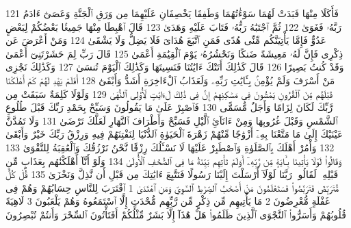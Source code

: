 {\tiny\colorbox{cl_aya}{121}} فَأَكَلَا مِنْهَا فَبَدَتْ لَهُمَا سَوْءَٰتُهُمَا وَطَفِقَا يَخْصِفَانِ عَلَيْهِمَا مِن وَرَقِ ٱلْجَنَّةِ وَعَصَىٰٓ ءَادَمُ رَبَّهُۥ فَغَوَىٰ
{\tiny\colorbox{cl_aya}{122}} ثُمَّ ٱجْتَبَٰهُ رَبُّهُۥ فَتَابَ عَلَيْهِ وَهَدَىٰ
{\tiny\colorbox{cl_aya}{123}} قَالَ ٱهْبِطَا مِنْهَا جَمِيعًۢا بَعْضُكُمْ لِبَعْضٍ عَدُوٌّ فَإِمَّا يَأْتِيَنَّكُم مِّنِّى هُدًى فَمَنِ ٱتَّبَعَ هُدَاىَ فَلَا يَضِلُّ وَلَا يَشْقَىٰ
{\tiny\colorbox{cl_aya}{124}} وَمَنْ أَعْرَضَ عَن ذِكْرِى فَإِنَّ لَهُۥ مَعِيشَةً ضَنكًا وَنَحْشُرُهُۥ يَوْمَ ٱلْقِيَٰمَةِ أَعْمَىٰ
{\tiny\colorbox{cl_aya}{125}} قَالَ رَبِّ لِمَ حَشَرْتَنِىٓ أَعْمَىٰ وَقَدْ كُنتُ بَصِيرًا
{\tiny\colorbox{cl_aya}{126}} قَالَ كَذَٰلِكَ أَتَتْكَ ءَايَٰتُنَا فَنَسِيتَهَا وَكَذَٰلِكَ ٱلْيَوْمَ تُنسَىٰ
{\tiny\colorbox{cl_aya}{127}} وَكَذَٰلِكَ نَجْزِى مَنْ أَسْرَفَ وَلَمْ يُؤْمِنۢ بِـَٔايَٰتِ رَبِّهِۦ وَلَعَذَابُ ٱلْءَاخِرَةِ أَشَدُّ وَأَبْقَىٰٓ
{\tiny\colorbox{cl_aya}{128}} أَفَلَمْ يَهْدِ لَهُمْ كَمْ أَهْلَكْنَا قَبْلَهُم مِّنَ ٱلْقُرُونِ يَمْشُونَ فِى مَسَٰكِنِهِمْ إِنَّ فِى ذَٰلِكَ لَءَايَٰتٍ لِّأُو۟لِى ٱلنُّهَىٰ
{\tiny\colorbox{cl_aya}{129}} وَلَوْلَا كَلِمَةٌ سَبَقَتْ مِن رَّبِّكَ لَكَانَ لِزَامًا وَأَجَلٌ مُّسَمًّى
{\tiny\colorbox{cl_aya}{130}} فَٱصْبِرْ عَلَىٰ مَا يَقُولُونَ وَسَبِّحْ بِحَمْدِ رَبِّكَ قَبْلَ طُلُوعِ ٱلشَّمْسِ وَقَبْلَ غُرُوبِهَا وَمِنْ ءَانَآئِ ٱلَّيْلِ فَسَبِّحْ وَأَطْرَافَ ٱلنَّهَارِ لَعَلَّكَ تَرْضَىٰ
{\tiny\colorbox{cl_aya}{131}} وَلَا تَمُدَّنَّ عَيْنَيْكَ إِلَىٰ مَا مَتَّعْنَا بِهِۦٓ أَزْوَٰجًا مِّنْهُمْ زَهْرَةَ ٱلْحَيَوٰةِ ٱلدُّنْيَا لِنَفْتِنَهُمْ فِيهِ وَرِزْقُ رَبِّكَ خَيْرٌ وَأَبْقَىٰ
{\tiny\colorbox{cl_aya}{132}} وَأْمُرْ أَهْلَكَ بِٱلصَّلَوٰةِ وَٱصْطَبِرْ عَلَيْهَا لَا نَسْـَٔلُكَ رِزْقًا نَّحْنُ نَرْزُقُكَ وَٱلْعَٰقِبَةُ لِلتَّقْوَىٰ
{\tiny\colorbox{cl_aya}{133}} وَقَالُوا۟ لَوْلَا يَأْتِينَا بِـَٔايَةٍ مِّن رَّبِّهِۦٓ أَوَلَمْ تَأْتِهِم بَيِّنَةُ مَا فِى ٱلصُّحُفِ ٱلْأُولَىٰ
{\tiny\colorbox{cl_aya}{134}} وَلَوْ أَنَّآ أَهْلَكْنَٰهُم بِعَذَابٍ مِّن قَبْلِهِۦ لَقَالُوا۟ رَبَّنَا لَوْلَآ أَرْسَلْتَ إِلَيْنَا رَسُولًا فَنَتَّبِعَ ءَايَٰتِكَ مِن قَبْلِ أَن نَّذِلَّ وَنَخْزَىٰ
{\tiny\colorbox{cl_aya}{135}} قُلْ كُلٌّ مُّتَرَبِّصٌ فَتَرَبَّصُوا۟ فَسَتَعْلَمُونَ مَنْ أَصْحَٰبُ ٱلصِّرَٰطِ ٱلسَّوِىِّ وَمَنِ ٱهْتَدَىٰ
{\tiny\colorbox{cl_aya}{1}} ٱقْتَرَبَ لِلنَّاسِ حِسَابُهُمْ وَهُمْ فِى غَفْلَةٍ مُّعْرِضُونَ
{\tiny\colorbox{cl_aya}{2}} مَا يَأْتِيهِم مِّن ذِكْرٍ مِّن رَّبِّهِم مُّحْدَثٍ إِلَّا ٱسْتَمَعُوهُ وَهُمْ يَلْعَبُونَ
{\tiny\colorbox{cl_aya}{3}} لَاهِيَةً قُلُوبُهُمْ وَأَسَرُّوا۟ ٱلنَّجْوَى ٱلَّذِينَ ظَلَمُوا۟ هَلْ هَٰذَآ إِلَّا بَشَرٌ مِّثْلُكُمْ أَفَتَأْتُونَ ٱلسِّحْرَ وَأَنتُمْ تُبْصِرُونَ
